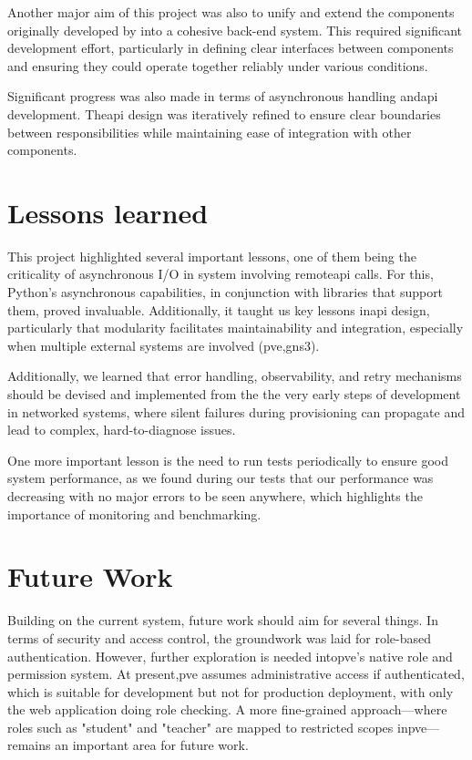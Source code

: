 Another major aim of this project was also to unify and extend the components originally developed by \citet{santos2024} into 
a cohesive back-end system. This required significant development effort, particularly in defining clear interfaces between 
components and ensuring they could operate together reliably under various conditions.

Significant progress was also made in terms of asynchronous handling and\ac{api} development. The\ac{api} design was 
iteratively refined to ensure clear boundaries between responsibilities while maintaining ease of integration with other 
components.


\section{Lessons learned}
    This project highlighted several important lessons, one of them being the criticality of asynchronous I/O in system 
    involving remote\ac{api} calls. For this, Python's asynchronous capabilities, in conjunction with libraries that support 
    them, proved invaluable. Additionally, it taught us key lessons in\ac{api} design, particularly that modularity facilitates 
    maintainability and integration, especially when multiple external systems are involved (\ac{pve},\ac{gns3}). 

    Additionally, we learned that error handling, observability, and retry mechanisms should be devised and implemented from the 
    the very early steps of development in networked systems, where silent failures during provisioning can propagate and lead to 
    complex, hard-to-diagnose issues.

    One more important lesson is the need to run tests periodically to ensure good system performance, as we found during 
    our tests that our performance was decreasing with no major errors to be seen anywhere, which highlights the importance of 
    monitoring and benchmarking.


\section{Future Work}
    Building on the current system, future work should aim for several things. In terms of security and access control, the 
    groundwork was laid for role-based authentication. However, further exploration is needed into\ac{pve}'s native role and 
    permission system. At present,\ac{pve} assumes administrative access if authenticated, which is suitable for development 
    but not for production deployment, with only the web application doing role checking. A more fine-grained approach—where 
    roles such as "student" and "teacher" are mapped to restricted scopes in\ac{pve}—remains an important area for future work.

